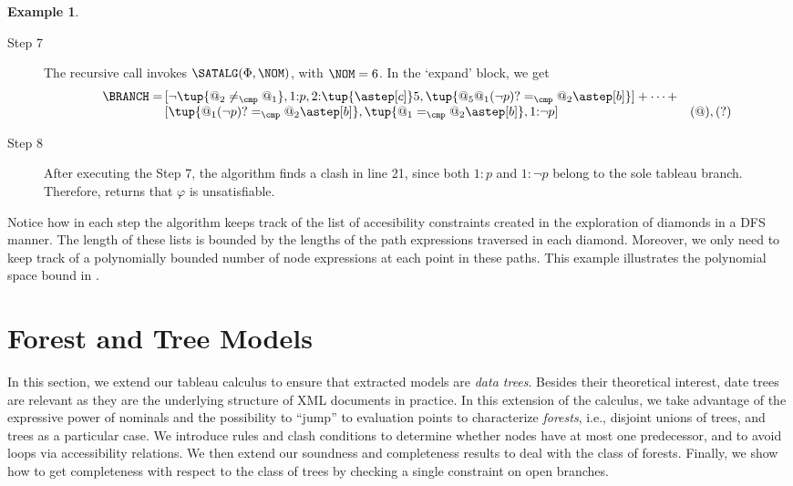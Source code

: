 \documentclass[10pt,a4paper]{amsart}
\theoremstyle{definition}
\newtheorem{exa}[thm]{Example}
\theoremstyle{remark}
\begin{document}
\begin{exa}
\begin{description}
  \item[Step 7] 
    The recursive call invokes $\SATALG(\Phi,\NOM)$, with $\NOM=6$. In the `expand' block, we get 
    \[
      \begin{array}{r@{\,}@{}lr}
        \BRANCH = 
            &
            [
              \neg\tup{@_2\neq_{\cmp}@_1}, 1{:}p, 2{:}\tup{\astep[c]}5, \tup{@_5@_1(\neg p)? =_\cmp @_2\astep[b]}
            ] + \dots + \\
            &
            [
              \tup{@_1(\neg p)? =_{\cmp} @_2\astep[b]}, \tup{@_1 =_{\cmp}@_2\astep[b]}, 1{:}\neg p
            ] 
              & (@), (?) 
      \end{array}
    \]
    \item[Step 8] 
      After executing the Step 7, the algorithm finds a clash in line 21, since both $1{:}p$ and $1{:}\neg p$ belong to the sole tableau branch. Therefore,  returns that $\varphi$ is unsatisfiable.
\end{description}

Notice how in each step the algorithm keeps track of the list of accesibility constraints created in the exploration of diamonds in a DFS manner.
The length of these lists is bounded by the lengths of the path expressions traversed in each diamond.
Moreover, we only need to keep track of a polynomially bounded number of node expressions at each point in these paths.
This example illustrates the polynomial space bound in .
\end{exa}

\section{Forest and Tree Models}
\label{sec:extensionplus}


In this section, we extend our tableau calculus to ensure that extracted models are \emph{data trees}.
Besides their theoretical interest, date trees are relevant as they are the underlying structure of XML documents in practice.
In this extension of the calculus, we take advantage of the expressive power of nominals and the possibility to ``jump'' to evaluation points to characterize \emph{forests}, i.e., disjoint unions of trees, and trees as a particular case.
We introduce rules and clash conditions to determine whether nodes have at most one predecessor, and to avoid loops via accessibility relations.  
We then extend our soundness and completeness results to deal with the
class of forests.
Finally, we show how to  get completeness with respect to the class of trees by
checking a single constraint on open branches.
\end{document}
